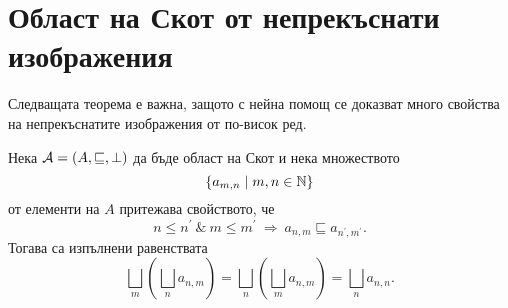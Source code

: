 \section{Област на Скот от непрекъснати изображения}

Следващата теорема е важна, защото с нейна помощ се доказват много свойства на непрекъснатите изображения от по-висок ред.

\begin{theorem}\label{th:double-chain}
  Нека $\mathcal{A} = (A,\sqsubseteq,\bot)$ да бъде област на Скот и нека множеството 
  \[\{a_{m,n} \mid m,n \in \mathbb{N}\}\] от елементи на $A$ притежава свойството, че 
  \[n \leq n^\prime\ \&\ m \leq m^\prime\ \Rightarrow\ a_{n,m} \sqsubseteq a_{n^\prime,m^\prime}.\]
  Тогава са изпълнени равенствата
  \[\bigsqcup_m(\bigsqcup_n a_{n,m}) = \bigsqcup_n(\bigsqcup_{m} a_{n,m}) = \bigsqcup_n a_{n,n}.\]
\end{theorem}
